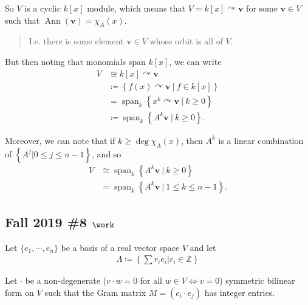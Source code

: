 \begin{solution}
So \(V\) is a cyclic \(k[x]\) module, which means that
\(V = k[x]\curvearrowright\mathbf{v}\) for some \(\mathbf{v}\in V\) such
that \(\operatorname{Ann}(\mathbf{v}) = \chi_A(x)\).

\begin{quote}
I.e. there is some element \(\mathbf{v}\in V\) whose orbit is all of
\(V\).
\end{quote}

But then noting that monomials span \(k[x]\), we can write
\begin{align*}
V &\cong
k[x] \curvearrowright\mathbf{v} \\
&\coloneqq\left\{{f(x) \curvearrowright\mathbf{v} {~\mathrel{\Big|}~}f \in k[x]}\right\} \\
&= {\operatorname{span}}_k \left\{{x^k \curvearrowright\mathbf{v} {~\mathrel{\Big|}~}k \geq 0}\right\} \\
&\coloneqq{\operatorname{span}}_k \left\{{A^k\mathbf{v} {~\mathrel{\Big|}~}k \geq 0}\right\}
.\end{align*}

Moreover, we can note that if \(k \geq \deg \chi_A(x)\), then \(A^k\) is
a linear combination of
\(\left\{{A^j \mathrel{\Big|}0 \leq j \leq n-1}\right\}\), and so
\begin{align*}
V &\cong {\operatorname{span}}_k \left\{{A^k\mathbf{v} {~\mathrel{\Big|}~}k \geq 0}\right\} \\
&= {\operatorname{span}}_k \left\{{A^k\mathbf{v} {~\mathrel{\Big|}~}1 \leq k \leq n-1}\right\}
.\end{align*}

\end{solution}

\hypertarget{fall-2019-8-work}{%
\subsection{\texorpdfstring{Fall 2019 \#8
\(\work\)}{Fall 2019 \#8 \textbackslash work}}\label{fall-2019-8-work}}

Let \(\{e_1, \cdots, e_n \}\) be a basis of a real vector space \(V\)
and let
\begin{align*}
\Lambda \coloneqq\left\{{ \sum r_i e_i \mathrel{\Big|}r_i \in {\mathbb{Z}}}\right\}
\end{align*}

Let \(\cdot\) be a non-degenerate (\(v \cdot w = 0\) for all
\(w \in V \iff v = 0\)) symmetric bilinear form on \(V\) such that the
Gram matrix \(M = (e_i \cdot e_j )\) has integer entries.

